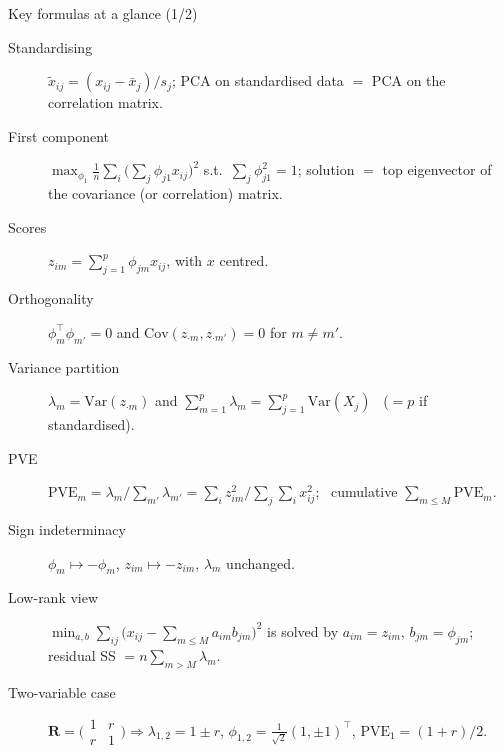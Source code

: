 \documentclass[aspectratio=169,11pt]{beamer}
\begin{document}
\begin{frame}{Key formulas at a glance (1/2)}
  \footnotesize
  \begin{description}
    \item[Standardising] $\tilde x_{ij}=(x_{ij}-\bar x_j)/s_j$; PCA on standardised data
          $=$ PCA on the correlation matrix.
    \item[First component] $\max_{\phi_1}\frac1n\sum_i\bigl(\sum_j\phi_{j1}x_{ij}\bigr)^2$
          s.t.\ $\sum_j\phi_{j1}^2=1$; solution $=$ top eigenvector of the covariance
          (or correlation) matrix.
    \item[Scores] $z_{im}=\sum_{j=1}^{p}\phi_{jm}x_{ij}$, with $x$ centred.
    \item[Orthogonality] $\phi_m^\top\phi_{m'}=0$ and $\mathrm{Cov}(z_{\cdot m},z_{\cdot m'})=0$
          for $m\ne m'$.
    \item[Variance partition] $\lambda_m=\mathrm{Var}(z_{\cdot m})$ and
          $\sum_{m=1}^{p}\lambda_m=\sum_{j=1}^{p}\mathrm{Var}(X_j)$ \ ($=p$ if standardised).
    \item[PVE] $\mathrm{PVE}_m=\lambda_m/\sum_{m'}\lambda_{m'}
          =\sum_i z_{im}^2\big/\sum_j\sum_i x_{ij}^2$; \ cumulative
          $\sum_{m\le M}\mathrm{PVE}_m$.
    \item[Sign indeterminacy] $\phi_m\mapsto-\phi_m$, $z_{im}\mapsto-z_{im}$, $\lambda_m$
          unchanged.
    \item[Low-rank view] $\min_{a,b}\sum_{ij}\bigl(x_{ij}-\sum_{m\le M}a_{im}b_{jm}\bigr)^2$
          is solved by $a_{im}=z_{im}$, $b_{jm}=\phi_{jm}$; residual SS
          $=n\sum_{m>M}\lambda_m$.
    \item[Two-variable case] $\mathbf{R}=\bigl(\begin{smallmatrix}1&r\\r&1\end{smallmatrix}\bigr)
          \Rightarrow \lambda_{1,2}=1\pm r$, $\phi_{1,2}=\tfrac{1}{\sqrt2}(1,\pm1)^\top$,
          $\mathrm{PVE}_1=(1+r)/2$.
  \end{description}
\end{frame}
\end{document}
